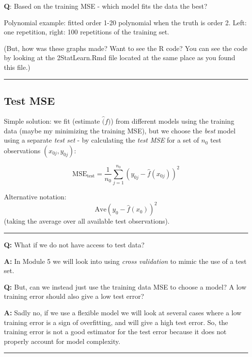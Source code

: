 \documentclass[]{article}
\begin{document}
\textbf{Q}: Based on the training MSE - which model fits the data the
best?

Polynomial example: fitted order 1-20 polynomial when the truth is order
2. Left: one repetition, right: 100 repetitions of the training set.

(But, how was these graphs made? Want to see the R code? You can see the
code by looking at the 2StatLearn.Rmd file located at the same place as
you found this file.)

\begin{center}\rule{0.5\linewidth}{\linethickness}\end{center}

\hypertarget{test-mse}{%
\subsection{Test MSE}\label{test-mse}}

Simple solution: we fit (estimate \(\hat(f)\)) from different models
using the training data (maybe my minimizing the training MSE), but we
choose the \emph{best} model using a separate \emph{test set} - by
calculating the \emph{test MSE} for a set of \(n_0\) test observations
\((x_{0j},y_{0j})\):

\[ \text{MSE}_{\text{test}}=\frac{1}{n_0}\sum_{j=1}^{n_0} (y_{0j}-\hat{f}(x_{0j}))^2\]

Alternative notation: \[\text{Ave}(y_0-\hat{f}(x_0))^2\] (taking the
average over all available test observations).

\begin{center}\rule{0.5\linewidth}{\linethickness}\end{center}

\textbf{Q:} What if we do not have access to test data?

\textbf{A:} In Module 5 we will look into using \emph{cross validation}
to mimic the use of a test set.

\textbf{Q:} But, can we instead just use the training data MSE to choose
a model? A low training error should also give a low test error?

\textbf{A:} Sadly no, if we use a flexible model we will look at several
cases where a low training error is a sign of overfitting, and will give
a high test error. So, the training error is not a good estimator for
the test error because it does not properly account for model
complexity.

\begin{center}\rule{0.5\linewidth}{\linethickness}\end{center}
\end{document}

